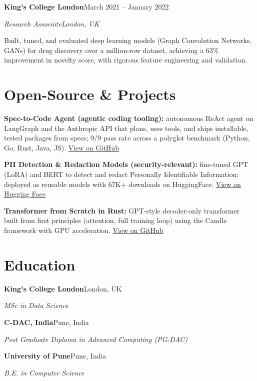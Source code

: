 \documentclass[10pt,a4paper]{article}
\newcommand{\entry}[4]{%
  {\color{company}\bfseries #1}\hfill {\color{muted}#2}\par
  \vspace{1pt}
  {\itshape #3}\hfill {\color{muted}\itshape #4}\par
  \vspace{3pt}%
}
\begin{document}
\entry{King's College London}{March 2021 -- January 2022}{Research Associate}{London, UK}
\begin{tight}
  \item Built, tuned, and evaluated deep learning models (Graph Convolution Networks, GANs) for drug discovery over a million-row dataset, achieving a 63\% improvement in novelty score, with rigorous feature engineering and validation.
\end{tight}

\section{Open-Source \& Projects}
\begin{tight}
  \item \textbf{Spec-to-Code Agent (agentic coding tooling):} autonomous ReAct agent on LangGraph and the Anthropic API that plans, uses tools, and ships installable, tested packages from specs; 9/9 pass rate across a polyglot benchmark (Python, Go, Rust, Java, JS). \href{https://github.com/abhijeetscode/Spec-to-Code-Agent}{View on GitHub}
  \item \textbf{PII Detection \& Redaction Models (security-relevant):} fine-tuned GPT (LoRA) and BERT to detect and redact Personally Identifiable Information; deployed as reusable models with 67K+ downloads on HuggingFace. \href{https://huggingface.co/ab-ai/pii_model}{View on Hugging Face}
  \item \textbf{Transformer from Scratch in Rust:} GPT-style decoder-only transformer built from first principles (attention, full training loop) using the Candle framework with GPU acceleration. \href{https://github.com/abhijeetscode/transformer-rust}{View on GitHub}
\end{tight}

\section{Education}
{\color{company}\bfseries King's College London}\hfill {\color{muted}London, UK}\par
{\itshape MSc in Data Science}\par\vspace{2pt}
{\color{company}\bfseries C-DAC, India}\hfill {\color{muted}Pune, India}\par
{\itshape Post Graduate Diploma in Advanced Computing (PG-DAC)}\par\vspace{2pt}
{\color{company}\bfseries University of Pune}\hfill {\color{muted}Pune, India}\par
{\itshape B.E. in Computer Science}\par
\end{document}
